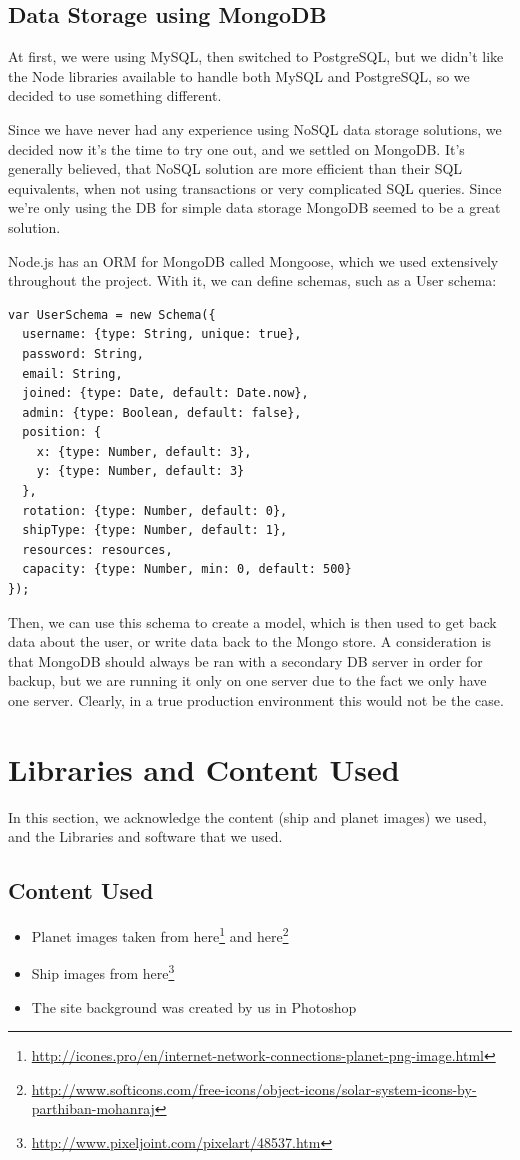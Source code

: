 \documentclass[a4paper,11pt]{article}
\begin{document}
		\subsection{Data Storage using MongoDB}
			At first, we were using MySQL, then switched to PostgreSQL, but we didn't like the Node libraries available to handle both MySQL and PostgreSQL, so we decided to use something different.
			 
			Since we have never had any experience using NoSQL data storage solutions, we decided now it's the time to try one out, and we settled on MongoDB. It's generally believed, that NoSQL solution are more efficient than their SQL equivalents, when not using transactions or very complicated SQL queries. Since we're only using the DB for simple data storage MongoDB seemed to be a great solution.
			
			Node.js has an ORM for MongoDB called Mongoose, which we used extensively throughout the project. With it, we can define schemas, such as a User schema:
			
			\begin{verbatim}
var UserSchema = new Schema({
  username: {type: String, unique: true},
  password: String,
  email: String,
  joined: {type: Date, default: Date.now},
  admin: {type: Boolean, default: false},
  position: {
    x: {type: Number, default: 3},
    y: {type: Number, default: 3}
  },
  rotation: {type: Number, default: 0},
  shipType: {type: Number, default: 1},
  resources: resources,
  capacity: {type: Number, min: 0, default: 500}
});
			\end{verbatim}
		
			Then, we can use this schema to create a model, which is then used to get back data about the user, or write data back to the Mongo store. A consideration is that MongoDB should always be ran with a secondary DB server in order for backup, but we are running it only on one server due to the fact we only have one server. Clearly, in a true production environment this would not be the case.
			
	
	\section{Libraries and Content Used}
		In this section, we acknowledge the content (ship and planet images) we used, and the Libraries and software that we used.
		
		\subsection{Content Used}
			\begin{itemize}
				\item Planet images taken from here\footnote{\url{http://icones.pro/en/internet-network-connections-planet-png-image.html}} and here\footnote{\url{http://www.softicons.com/free-icons/object-icons/solar-system-icons-by-parthiban-mohanraj}}
				\item Ship images from here\footnote{\url{http://www.pixeljoint.com/pixelart/48537.htm}}
				\item The site background was created by us in Photoshop
			\end{itemize}
			
\end{document}
